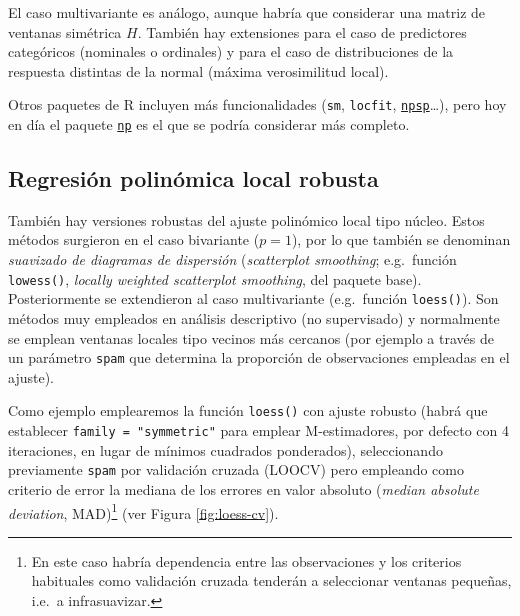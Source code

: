 \documentclass[
]{book}
\theoremstyle{break}
\theoremstyle{nonumberplain}
\begin{document}
El caso multivariante es análogo, aunque habría que considerar una matriz de ventanas simétrica \(H\). También hay extensiones para el caso de predictores categóricos (nominales o ordinales) y para el caso de distribuciones de la respuesta distintas de la normal (máxima verosimilitud local).

Otros paquetes de R incluyen más funcionalidades (\texttt{sm}, \texttt{locfit}, \href{https://rubenfcasal.github.io/npsp}{\texttt{npsp}}\ldots), pero hoy en día el paquete \href{https://github.com/JeffreyRacine/R-Package-np}{\texttt{np}} es el que se podría considerar más completo.

\hypertarget{regresiuxf3n-polinuxf3mica-local-robusta}{%
\subsection{Regresión polinómica local robusta}\label{regresiuxf3n-polinuxf3mica-local-robusta}}

También hay versiones robustas del ajuste polinómico local tipo núcleo.
Estos métodos surgieron en el caso bivariante (\(p=1\)), por lo que también se denominan \emph{suavizado de diagramas de dispersión} (\emph{scatterplot smoothing}; e.g.~función \texttt{lowess()}, \emph{locally weighted scatterplot smoothing}, del paquete base).
Posteriormente se extendieron al caso multivariante (e.g.~función \texttt{loess()}).
Son métodos muy empleados en análisis descriptivo (no supervisado) y normalmente se emplean ventanas locales tipo vecinos más cercanos (por ejemplo a través de un parámetro \texttt{spam} que determina la proporción de observaciones empleadas en el ajuste).

Como ejemplo emplearemos la función \texttt{loess()} con ajuste robusto (habrá que establecer \texttt{family\ =\ "symmetric"} para emplear M-estimadores, por defecto con 4 iteraciones, en lugar de mínimos cuadrados ponderados), seleccionando previamente \texttt{spam} por validación cruzada (LOOCV) pero empleando como criterio de error la mediana de los errores en valor absoluto (\emph{median absolute deviation}, MAD)\footnote{En este caso habría dependencia entre las observaciones y los criterios habituales como validación cruzada tenderán a seleccionar ventanas pequeñas, i.e.~a infrasuavizar.} (ver Figura \ref{fig:loess-cv}).
\end{document}
